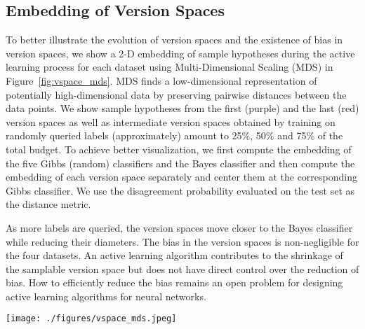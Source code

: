 \documentclass[runningheads, envcountsame, a4paper]{llncs}
\begin{document}
\subsection{Embedding of Version Spaces}
To better illustrate the evolution of version spaces and the existence of bias in version spaces, we show a 2-D embedding of sample hypotheses during the active learning process for each dataset using Multi-Dimensional Scaling (MDS) \cite{Kruskal78} in Figure~\ref{fig:vspace_mds}. MDS finds a low-dimensional representation of potentially high-dimensional data by preserving pairwise distances between the data points. We show sample hypotheses from the first (purple) and the last (red) version spaces as well as intermediate version spaces obtained by training on randomly queried labels (approximately) amount to 25\%, 50\% and 75\% of the total budget. To achieve better visualization, we first compute the embedding of the five Gibbs (random) classifiers and the Bayes classifier and then compute the embedding of each version space separately and center them at the corresponding Gibbs classifier. We use the disagreement probability evaluated on the test set as the distance metric.

As more labels are queried, the version spaces move closer to the Bayes classifier while reducing their diameters. The bias in the version spaces is non-negligible for the four datasets. An active learning algorithm contributes to the shrinkage of the samplable version space but does not have direct control over the reduction of bias. How to efficiently reduce the bias remains an open problem for designing active learning algorithms for neural networks.
\begin{figure*}[ht!]
\begin{center}
\texttt{[image: ./figures/vspace\_mds.jpeg]}
\end{center}
   \caption{Embedding of version spaces using Multi-Dimensional Scaling (MDS). The 2-D embedding of version spaces obtained by training on random samples is calculated through MDS for each dataset. The purple dots in the largest clusters illustrate a set of sample hypotheses from the version space at the beginning of the active learning experiments, while the red dots in the smallest clusters illustrate hypotheses at the end, being closer to the Bayes classifier (star marker) than those from other version spaces. The blue, green and orange dots represent version spaces obtained by training with (approximately) 25\%, 50\% and 75\% labels of the total budget, respectively. The Gibbs classifier (triangle marker) corresponding to each version space is a random classifier that predicts by randomly sampling a hypothesis from the version space and making the same prediction as the sample hypothesis does.}
\label{fig:vspace_mds}
\end{figure*}
\end{document}

